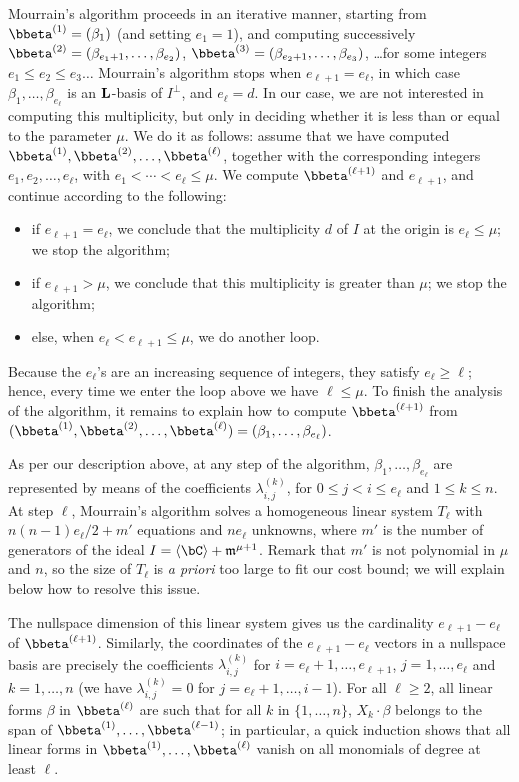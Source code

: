 \documentclass[12pt]{article}
\begin{document}
Mourrain's algorithm proceeds in an iterative manner, starting from
$\bbeta^{(1)}=(\beta_{1})$ (and setting $e_1=1$), and computing
successively $\bbeta^{(2)}=(\beta_{e_1+1},\dots,\beta_{e_2})$,
$\bbeta^{(3)}=(\beta_{e_2+1},\dots,\beta_{e_3})$, \dots for some
integers $e_1 \le e_2 \le e_3 \dots$ Mourrain's algorithm stops when
$e_{\ell+1}=e_{\ell}$, in which case $\beta_1,\dots,\beta_{e_\ell}$ is
an $\mathbf{L}$-basis of $I^\perp$, and $e_\ell=d$. In our case, we
are not interested in computing this multiplicity, but only in
deciding whether it is less than or equal to the parameter $\mu$. We do it as follows: assume that we have
computed $\bbeta^{(1)},\bbeta^{(2)},\dots,\bbeta^{(\ell)}$, together
with the corresponding integers $e_1,e_2,\dots,e_\ell$, with $e_1 <
\cdots < e_\ell \le \mu$. We compute $\bbeta^{(\ell+1)}$ and $e_{\ell+1}$,
and continue according to the following:
\begin{itemize}
\item if $e_{\ell+1}=e_{\ell}$, we conclude that the multiplicity
  $d$ of $I$ at the origin is $e_\ell \le \mu$; we stop the
  algorithm;
\item if $e_{\ell+1} > \mu$, we conclude that this multiplicity is greater 
  than $\mu$; we stop the algorithm;
\item else, when $e_\ell < e_{\ell+1} \le \mu$, we do another loop.
\end{itemize}
Because the $e_\ell$'s are an increasing sequence of integers, they
satisfy $e_\ell \ge \ell$; hence, every time we enter the loop above we
have $\ell \le \mu$. To finish the analysis of the algorithm, it
remains to explain how to compute $\bbeta^{(\ell+1)}$ from
$(\bbeta^{(1)},\bbeta^{(2)},\dots,\bbeta^{(\ell)})=(\beta_{1},\dots,\beta_{e_\ell})$.

As per our description above, at any step of the algorithm,
$\beta_{1},\dots,\beta_{e_\ell}$ are represented by means of the
coefficients $\lambda^{(k)}_{i,j}$, for $0 \le j < i \le e_{\ell}$ and
$1 \le k \le n$.  At step $\ell$, Mourrain's algorithm solves a homogeneous linear system
$T_\ell$ with $n(n-1) e_\ell/2+m'$ equations and $n e_\ell$ unknowns,
where $m'$ is the number of generators of the ideal $I= \langle \bC
\rangle + \m^{\mu+1}$. Remark that $m'$ is not polynomial in $\mu$ 
and $n$, so the size of $T_\ell$ is {\em a priori} too large to 
fit our cost bound; we will explain below how to resolve this issue.

The nullspace dimension of this linear system gives us the cardinality
$e_{\ell+1}-e_{\ell}$ of $\bbeta^{(\ell+1)}$. Similarly, the coordinates of
the $e_{\ell+1}-e_{\ell}$ vectors in a nullspace basis are precisely
the coefficients $\lambda^{(k)}_{i,j}$ for
$i=e_{\ell}+1,\dots,e_{\ell+1}$, $j=1,\dots,e_\ell$ and $k=1,\dots,n$
(we have $\lambda^{(k)}_{i,j}=0$ for $j=e_{\ell}+1,\dots,i-1$). For
all $\ell \ge 2$, all linear forms $\beta$ in $\bbeta^{(\ell)}$ are
such that for all $k$ in $\{1,\dots,n\}$, $X_k \cdot \beta$ belongs to
the span of $\bbeta^{(1)},\dots,\bbeta^{(\ell-1)}$; in particular, a
quick induction shows that all linear forms in
$\bbeta^{(1)},\dots,\bbeta^{(\ell)}$ vanish on all monomials of degree
at least $\ell$.
\end{document}
